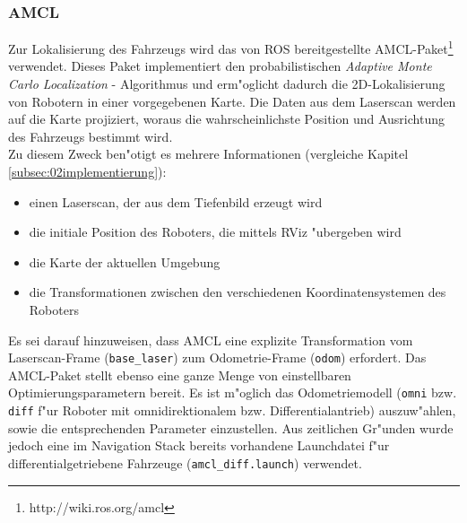 \subsubsection{AMCL}
\label{subsec:02amcl}

Zur Lokalisierung des Fahrzeugs wird das von ROS bereitgestellte AMCL-Paket\footnote{http://wiki.ros.org/amcl} verwendet. Dieses Paket implementiert den probabilistischen \emph{Adaptive Monte Carlo Localization} - Algorithmus \cite{amcl} und erm"oglicht dadurch die 2D-Lokalisierung von Robotern in einer vorgegebenen Karte. Die Daten aus dem Laserscan werden auf die Karte projiziert, woraus die wahrscheinlichste Position und Ausrichtung des Fahrzeugs bestimmt wird.\\
Zu diesem Zweck ben"otigt es mehrere Informationen (vergleiche Kapitel \ref{subsec:02implementierung}): 
\begin{itemize}
\item einen Laserscan, der aus dem Tiefenbild erzeugt wird 
\item die initiale Position des Roboters, die mittels  RViz "ubergeben wird
\item die Karte der aktuellen Umgebung
\item die Transformationen zwischen den verschiedenen Koordinatensystemen des Roboters
\end{itemize}
Es sei darauf hinzuweisen, dass AMCL eine explizite Transformation vom Laserscan-Frame (\texttt{base\_laser}) zum Odometrie-Frame (\texttt{odom}) erfordert.
Das AMCL-Paket stellt ebenso eine ganze Menge von einstellbaren Optimierungsparametern bereit. Es ist m"oglich das Odometriemodell (\texttt{omni} bzw. \texttt{diff} f"ur Roboter mit omnidirektionalem bzw. Differentialantrieb) auszuw"ahlen, sowie die entsprechenden Parameter einzustellen. Aus zeitlichen Gr"unden wurde jedoch eine im Navigation Stack bereits vorhandene Launchdatei f"ur differentialgetriebene Fahrzeuge (\texttt{amcl\_diff.launch}) verwendet.